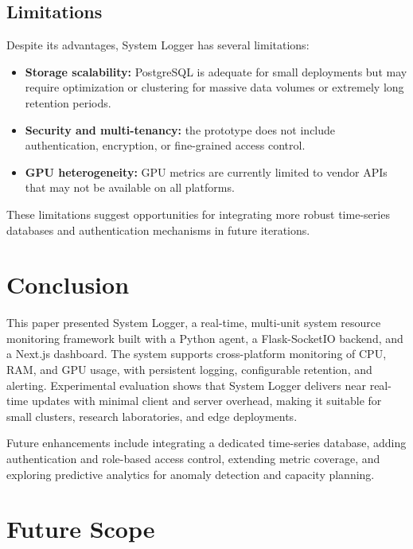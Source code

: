 \documentclass[conference]{IEEEtran}
\begin{document}
\subsection{Limitations}

Despite its advantages, System Logger has several limitations:
\begin{itemize}
  \item \textbf{Storage scalability:} PostgreSQL is adequate for small deployments but may require optimization or clustering for massive data volumes or extremely long retention periods.
  \item \textbf{Security and multi-tenancy:} the prototype does not include authentication, encryption, or fine-grained access control.
  \item \textbf{GPU heterogeneity:} GPU metrics are currently limited to vendor APIs that may not be available on all platforms.
\end{itemize}

These limitations suggest opportunities for integrating more robust time-series databases and authentication mechanisms in future iterations.

\section{Conclusion}
\label{sec:conclusion}

This paper presented System Logger, a real-time, multi-unit system resource monitoring framework built with a Python agent, a Flask-SocketIO backend, and a Next.js dashboard. The system supports cross-platform monitoring of CPU, RAM, and GPU usage, with persistent logging, configurable retention, and alerting. Experimental evaluation shows that System Logger delivers near real-time updates with minimal client and server overhead, making it suitable for small clusters, research laboratories, and edge deployments.

Future enhancements include integrating a dedicated time-series database, adding authentication and role-based access control, extending metric coverage, and exploring predictive analytics for anomaly detection and capacity planning.

\section{Future Scope}
\end{document}

